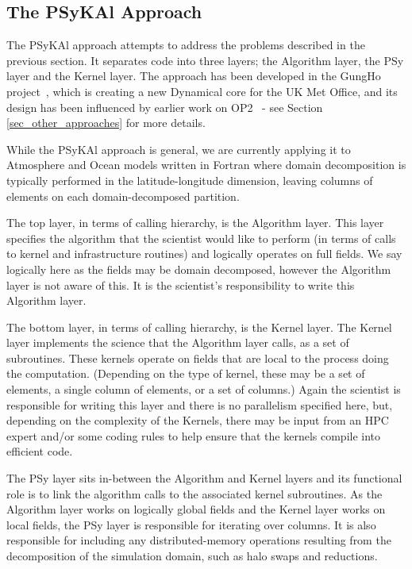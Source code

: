 \documentclass[gmdd, manuscript]{copernicus}
\begin{document}
\subsection{The {PS}y{KA}l Approach}

The {PS}y{KA}l approach attempts to address the problems described in
the previous section. It separates code into three layers; the
Algorithm layer, the PSy layer and the Kernel layer. The approach has
been developed in the GungHo project~\citep{GungHo}, which is creating
a new Dynamical core for the UK Met Office, and its design has been
influenced by earlier work on OP2~\citep{OP2, PYOP2} - see Section
\ref{sec_other_approaches} for more details.

While the {PS}y{KA}l approach is general, we are currently applying it to
Atmosphere and Ocean models written in Fortran where domain
decomposition is typically performed in the latitude-longitude
dimension, leaving columns of elements on each domain-decomposed
partition.

The top layer, in terms of calling hierarchy, is the Algorithm
layer. This layer specifies the algorithm that the scientist would like
to perform (in terms of calls to kernel and infrastructure routines)
and logically operates on full fields. We say logically here as the
fields may be domain decomposed, however the Algorithm layer is not
aware of this. It is the scientist's responsibility to write this
Algorithm layer.

The bottom layer, in terms of calling hierarchy, is the Kernel
layer. The Kernel layer implements the science that the Algorithm
layer calls, as a set of subroutines. These kernels operate on fields
that are local to the process doing the computation. (Depending on the
type of kernel, these may be a set of elements, a single column of
elements, or a set of columns.) Again the scientist is responsible for
writing this layer and there is no parallelism specified here, but,
depending on the complexity of the Kernels, there may be input from an
HPC expert and/or some coding rules to help ensure that the kernels
compile into efficient code.

The PSy layer sits in-between the Algorithm and Kernel layers and its
functional role is to link the algorithm calls to the associated
kernel subroutines. As the Algorithm layer works on logically global
fields and the Kernel layer works on local fields, the PSy layer is
responsible for iterating over columns. It is also responsible for
including any distributed-memory operations resulting from the
decomposition of the simulation domain, such as halo swaps and
reductions.
\end{document}
